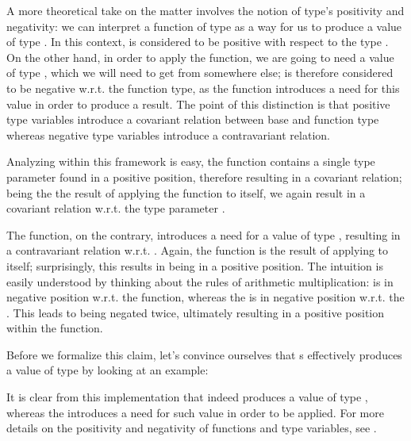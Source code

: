A more theoretical take on the matter involves the notion of type's positivity and negativity: we can interpret a function of type  as a way for us to produce a value of type . In this context,  is considered to be positive with respect to the type . On the other hand, in order to apply the function, we are going to need a value of type , which we will need to get from somewhere else;  is therefore considered to be negative w.r.t. the function type, as the function introduces a need for this value in order to produce a result. The point of this distinction is that positive type variables introduce a covariant relation between base and function type whereas negative type variables introduce a contravariant relation.

Analyzing  within this framework is easy, the  function contains a single type parameter found in a positive position, therefore resulting in a covariant relation; being the  the result of applying the  function to itself, we again result in a covariant relation w.r.t. the type parameter .

The  function, on the contrary, introduces a need for a value of type , resulting in a contravariant relation w.r.t. . Again, the  function is the result of applying  to itself; surprisingly, this results in  being in a positive position. The intuition is easily understood by thinking about the rules of arithmetic multiplication:  is in negative position w.r.t. the  function, whereas the  is in negative position w.r.t. the . This leads to  being negated twice, ultimately resulting in a positive position within the  function. 


Before we formalize this claim, let's convince ourselves that s effectively produces a value of type  by looking at an example:


It is clear from this implementation that  indeed produces a value of type , whereas the  introduces a need for such value in order to be applied. For more details on the positivity and negativity of functions and type variables, see \cite{pos-neg}\cite{pos-neg2}.

